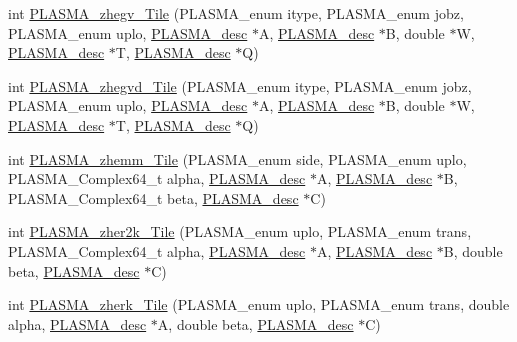 \begin{DoxyCompactItemize}
\item 
int \hyperlink{group__PLASMA__Complex64__t__Tile_gaf4bdf938225d0259e4df04006bd80655_gaf4bdf938225d0259e4df04006bd80655}{P\+L\+A\+S\+M\+A\+\_\+zhegv\+\_\+\+Tile} (P\+L\+A\+S\+M\+A\+\_\+enum itype, P\+L\+A\+S\+M\+A\+\_\+enum jobz, P\+L\+A\+S\+M\+A\+\_\+enum uplo, \hyperlink{structplasma__desc__t}{P\+L\+A\+S\+M\+A\+\_\+desc} $\ast$A, \hyperlink{structplasma__desc__t}{P\+L\+A\+S\+M\+A\+\_\+desc} $\ast$B, double $\ast$W, \hyperlink{structplasma__desc__t}{P\+L\+A\+S\+M\+A\+\_\+desc} $\ast$T, \hyperlink{structplasma__desc__t}{P\+L\+A\+S\+M\+A\+\_\+desc} $\ast$Q)
\item 
int \hyperlink{group__PLASMA__Complex64__t__Tile_gadbe098059f3edfb837f3294d4391bf02_gadbe098059f3edfb837f3294d4391bf02}{P\+L\+A\+S\+M\+A\+\_\+zhegvd\+\_\+\+Tile} (P\+L\+A\+S\+M\+A\+\_\+enum itype, P\+L\+A\+S\+M\+A\+\_\+enum jobz, P\+L\+A\+S\+M\+A\+\_\+enum uplo, \hyperlink{structplasma__desc__t}{P\+L\+A\+S\+M\+A\+\_\+desc} $\ast$A, \hyperlink{structplasma__desc__t}{P\+L\+A\+S\+M\+A\+\_\+desc} $\ast$B, double $\ast$W, \hyperlink{structplasma__desc__t}{P\+L\+A\+S\+M\+A\+\_\+desc} $\ast$T, \hyperlink{structplasma__desc__t}{P\+L\+A\+S\+M\+A\+\_\+desc} $\ast$Q)
\item 
int \hyperlink{group__PLASMA__Complex64__t__Tile_ga7f8b661b2774dd77bc0eef260f1eef3c_ga7f8b661b2774dd77bc0eef260f1eef3c}{P\+L\+A\+S\+M\+A\+\_\+zhemm\+\_\+\+Tile} (P\+L\+A\+S\+M\+A\+\_\+enum side, P\+L\+A\+S\+M\+A\+\_\+enum uplo, P\+L\+A\+S\+M\+A\+\_\+\+Complex64\+\_\+t alpha, \hyperlink{structplasma__desc__t}{P\+L\+A\+S\+M\+A\+\_\+desc} $\ast$A, \hyperlink{structplasma__desc__t}{P\+L\+A\+S\+M\+A\+\_\+desc} $\ast$B, P\+L\+A\+S\+M\+A\+\_\+\+Complex64\+\_\+t beta, \hyperlink{structplasma__desc__t}{P\+L\+A\+S\+M\+A\+\_\+desc} $\ast$C)
\item 
int \hyperlink{group__PLASMA__Complex64__t__Tile_gad2435eb3d2c1e66f89023aae6089cd04_gad2435eb3d2c1e66f89023aae6089cd04}{P\+L\+A\+S\+M\+A\+\_\+zher2k\+\_\+\+Tile} (P\+L\+A\+S\+M\+A\+\_\+enum uplo, P\+L\+A\+S\+M\+A\+\_\+enum trans, P\+L\+A\+S\+M\+A\+\_\+\+Complex64\+\_\+t alpha, \hyperlink{structplasma__desc__t}{P\+L\+A\+S\+M\+A\+\_\+desc} $\ast$A, \hyperlink{structplasma__desc__t}{P\+L\+A\+S\+M\+A\+\_\+desc} $\ast$B, double beta, \hyperlink{structplasma__desc__t}{P\+L\+A\+S\+M\+A\+\_\+desc} $\ast$C)
\item 
int \hyperlink{group__PLASMA__Complex64__t__Tile_ga01560f3e4d486a5576c6ed9b67756d67_ga01560f3e4d486a5576c6ed9b67756d67}{P\+L\+A\+S\+M\+A\+\_\+zherk\+\_\+\+Tile} (P\+L\+A\+S\+M\+A\+\_\+enum uplo, P\+L\+A\+S\+M\+A\+\_\+enum trans, double alpha, \hyperlink{structplasma__desc__t}{P\+L\+A\+S\+M\+A\+\_\+desc} $\ast$A, double beta, \hyperlink{structplasma__desc__t}{P\+L\+A\+S\+M\+A\+\_\+desc} $\ast$C)

\end{DoxyCompactItemize}
